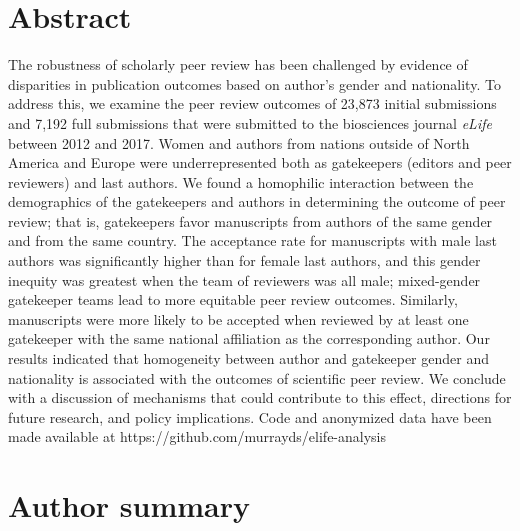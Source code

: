 \documentclass[10pt,letterpaper]{article}
\begin{document}
\section*{Abstract}
The robustness of scholarly peer review has been challenged by evidence of disparities in publication outcomes based on author’s gender and nationality. To address this, we examine the peer review outcomes of 23,873 initial submissions and 7,192 full submissions that were submitted to the biosciences journal \textit{eLife} between 2012 and 2017. Women and authors from nations outside of North America and Europe were underrepresented both as gatekeepers (editors and peer reviewers) and last authors. We found a homophilic interaction between the demographics of the gatekeepers and authors in determining the outcome of peer review; that is, gatekeepers favor manuscripts from authors of the same gender and from the same country. The acceptance rate for manuscripts with male last authors was significantly higher than for female last authors, and this gender inequity was greatest when the team of reviewers was all male; mixed-gender gatekeeper teams lead to more equitable peer review outcomes. Similarly, manuscripts were more likely to be accepted when reviewed by at least one gatekeeper with the same national affiliation as the corresponding author. Our results indicated that homogeneity between author and gatekeeper gender and nationality is associated with the outcomes of scientific peer review. We conclude with a discussion of mechanisms that could contribute to this effect, directions for future research, and policy implications. Code and anonymized data have been made available at https://github.com/murrayds/elife-analysis


\section*{Author summary}
\end{document}
